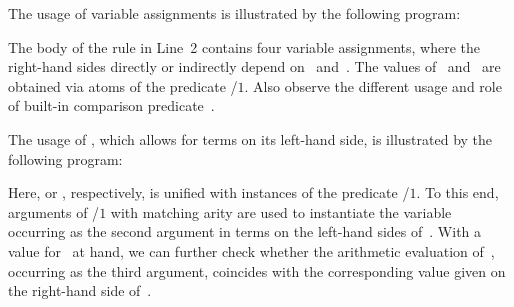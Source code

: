 \begin{example}\label{ex:assign}
The usage of variable assignments is illustrated by the following program:%
%
%

%
The body of the rule in Line~2 contains four variable assignments,
where the right-hand sides directly or indirectly
depend on~ and~.
The values of~ and~ are obtained via atoms of the predicate /$1$.
Also observe the different usage and role of built-in comparison predicate~\code{==}.
\eexample
\end{example}

\begin{example}\label{ex:unify}
The usage of \code{:=},
which allows for terms on its left-hand side,
is illustrated by the following program:
%

%
Here,  or
, respectively,
is unified with instances of the predicate /$1$.
To this end,
arguments of /$1$ with matching arity
are used to instantiate the variable~ occurring
as the second argument in terms on the left-hand sides of~\code{:=}.
With a value for~ at hand,
we can further check whether the arithmetic evaluation of~,
occurring as the third argument, coincides with the 
corresponding value given on the right-hand side of~\code{:=}.
%
\eexample
\end{example}

